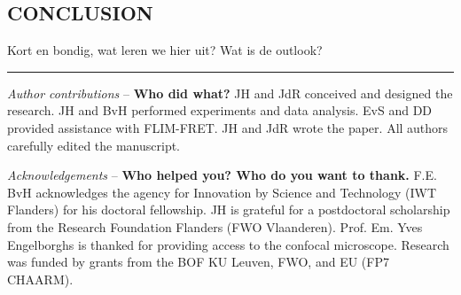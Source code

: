 \documentclass{uhphyspaper}
\begin{document}
\begin{multicols}{2}
\section{CONCLUSION}
Kort en bondig, wat leren we hier uit? 
Wat is de outlook?

\rule{\linewidth}{0.4pt}
\textit{Author contributions} -- \textbf{Who did what?} 
JH and JdR conceived and designed the research. 
JH and BvH performed experiments and data analysis. 
EvS and DD provided assistance with FLIM-FRET. JH and JdR wrote the paper. 
All authors carefully edited the manuscript.

\textit{Acknowledgements} -- \textbf{Who helped you? Who do you want to thank.} 
F.E. BvH acknowledges the agency for Innovation by Science and Technology (IWT Flanders) for his doctoral fellowship. 
JH is grateful for a postdoctoral scholarship from the Research Foundation Flanders (FWO Vlaanderen). 
Prof. Em. Yves Engelborghs is thanked for providing access to the confocal microscope. 
Research was funded by grants from the BOF KU Leuven, FWO, and EU (FP7 CHAARM).

\end{multicols}

\vspace{0.5cm}
\printbibliography[title={REFERENCES}]
\newpage
\end{document}
